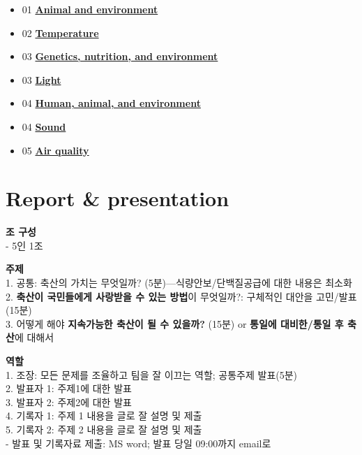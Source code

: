 \documentclass[]{book}
\providecommand{\tightlist}{%
  \setlength{\itemsep}{0pt}\setlength{\parskip}{0pt}}
\begin{document}
\begin{itemize}
\tightlist
\item
  01
  \textbf{\href{https://youngjunna.github.io/aes/02-AnimalandEnvironment}{Animal
  and environment}}\\
\item
  02
  \textbf{\href{https://youngjunna.github.io/aes/03-Temperature}{Temperature}}\\
\item
  03
  \textbf{\href{https://github.com/YoungjunNa/2019-animal-nutrition-and-the-environment/raw/master/03\%E1\%84\%8C\%E1\%85\%AE\%E1\%84\%8E\%E1\%85\%A1-\%E1\%84\%83\%E1\%85\%A9\%E1\%86\%BC\%E1\%84\%86\%E1\%85\%AE\%E1\%86\%AF\%E1\%84\%92\%E1\%85\%AA\%E1\%86\%AB\%E1\%84\%80\%E1\%85\%A7\%E1\%86\%BC\%E1\%84\%92\%E1\%85\%A1\%E1\%86\%A8.pdf}{Genetics,
  nutrition, and environment}}\\
\item
  03 \textbf{\href{https://youngjunna.github.io/aes/04-Light}{Light}}\\
\item
  04
  \textbf{\href{https://github.com/YoungjunNa/aes/raw/master/04-aes.pdf}{Human,
  animal, and environment}}\\
\item
  04 \textbf{\href{https://youngjunna.github.io/aes/05-Sound}{Sound}}\\
\item
  05 \textbf{\href{https://youngjunna.github.io/aes/06-AirQuality}{Air
  quality}}
\end{itemize}

\section{Report \& presentation}\label{report-presentation}

\textbf{조 구성}\\
- 5인 1조

\textbf{주제}\\
1. 공통: 축산의 가치는 무엇일까? (5분)---식량안보/단백질공급에 대한
내용은 최소화\\
2. \textbf{축산이 국민들에게 사랑받을 수 있는 방법}이 무엇일까?:
구체적인 대안을 고민/발표(15분)\\
3. 어떻게 해야 \textbf{지속가능한 축산이 될 수 있을까?} (15분) or
\textbf{통일에 대비한/통일 후 축산}에 대해서

\textbf{역할}\\
1. 조장: 모든 문제를 조율하고 팀을 잘 이끄는 역할; 공통주제 발표(5분)\\
2. 발표자 1: 주제1에 대한 발표\\
3. 발표자 2: 주제2에 대한 발표\\
4. 기록자 1: 주제 1 내용을 글로 잘 설명 및 제출\\
5. 기록자 2: 주제 2 내용을 글로 잘 설명 및 제출\\
- 발표 및 기록자료 제출: MS word; 발표 당일 09:00까지 email로
\end{document}
